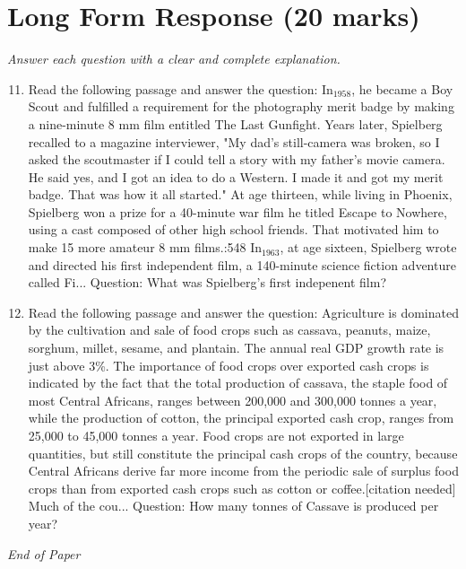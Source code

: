 \documentclass[12pt]{article}
\begin{document}
\section*{Long Form Response (20 marks)}
\textit{Answer each question with a clear and complete explanation.}
\begin{enumerate}[label=\arabic*.]
\setcounter{enumi}{10}
\item Read the following passage and answer the question: In$_{1958}$, he became a Boy Scout and fulfilled a requirement for the photography merit badge by making a nine-minute 8 mm film entitled The Last Gunfight. Years later, Spielberg recalled to a magazine interviewer, "My dad's still-camera was broken, so I asked the scoutmaster if I could tell a story with my father's movie camera. He said yes, and I got an idea to do a Western. I made it and got my merit badge. That was how it all started." At age thirteen, while living in Phoenix, Spielberg won a prize for a 40-minute war film he titled Escape to Nowhere, using a cast composed of other high school friends. That motivated him to make 15 more amateur 8 mm films.:548 In$_{1963}$, at age sixteen, Spielberg wrote and directed his first independent film, a 140-minute science fiction adventure called Fi... Question: What was Spielberg's first indepenent film?
\item Read the following passage and answer the question: Agriculture is dominated by the cultivation and sale of food crops such as cassava, peanuts, maize, sorghum, millet, sesame, and plantain. The annual real GDP growth rate is just above 3\%. The importance of food crops over exported cash crops is indicated by the fact that the total production of cassava, the staple food of most Central Africans, ranges between 200,000 and 300,000 tonnes a year, while the production of cotton, the principal exported cash crop, ranges from 25,000 to 45,000 tonnes a year. Food crops are not exported in large quantities, but still constitute the principal cash crops of the country, because Central Africans derive far more income from the periodic sale of surplus food crops than from exported cash crops such as cotton or coffee.[citation needed] Much of the cou... Question: How many tonnes of Cassave is produced per year?
\end{enumerate}

\vfill
\noindent\textit{End of Paper}
\end{document}
